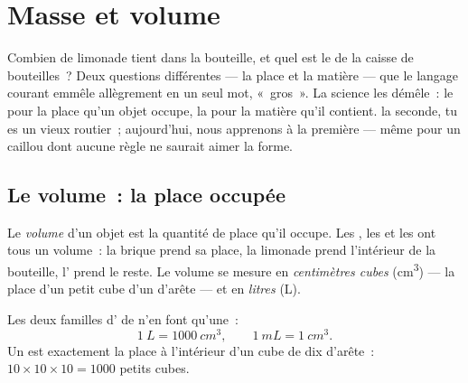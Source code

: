 \chapter{Masse et volume}\label{ch:g6:mass-and-volume}

Combien de limonade tient dans la bouteille, et quel est le  de
la caisse de bouteilles~? Deux questions différentes --- la place et
la matière --- que le langage courant emmêle allègrement en un seul
mot, «~gros~». La science les démêle~: le  pour la place qu'un
objet occupe, la  pour la matière qu'il contient.  la
seconde, tu es un vieux routier~; aujourd'hui, nous apprenons à
 la première --- même pour un caillou dont aucune règle ne
saurait aimer la forme.

\section{Le volume~: la place occupée}

\begin{definition}[Volume]\label{def:g6:mass-and-volume:volume}
Le \emph{volume} d'un objet est la quantité de place
qu'il occupe. Les , les  et les  ont tous un
volume~: la brique prend sa place, la limonade prend l'intérieur de
la bouteille, l' prend le reste. Le volume se mesure en
\emph{centimètres cubes} (\unit{cm^3}) --- la
place d'un petit cube d'un  d'arête --- et en
\emph{litres} (\unit{L}).
\end{definition}

\begin{proposition}\label{prop:g6:mass-and-volume:litre}
Les deux familles d' de  n'en font qu'une~:
\[
\qty{1}{L} = \qty{1000}{cm^3},
\qquad
\qty{1}{mL} = \qty{1}{cm^3}.
\]
Un  est exactement la place à l'intérieur d'un cube de dix
 d'arête~: $10 \times 10 \times 10 = 1000$ petits cubes.
\end{proposition}

